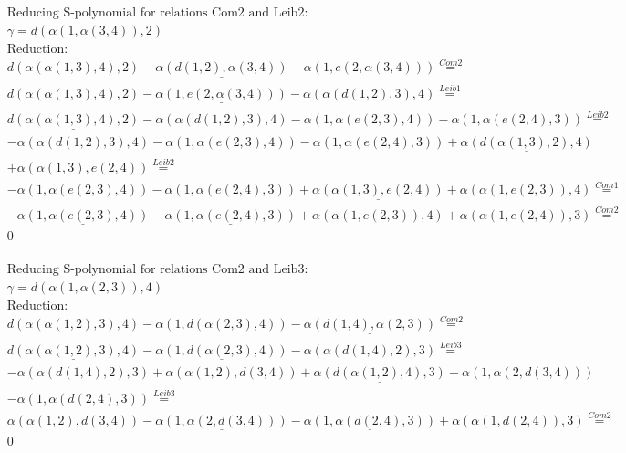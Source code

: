 \documentclass[11pt]{amsart}
\begin{document}
\begin{align*} 
& \text{Reducing S-polynomial for relations Com2 and Leib2:} \\ 
& \gamma = d(\alpha(1,\alpha(3,4)),2) \\ 
& \text{Reduction}: \\&d(\alpha(\alpha(1,3),4),2) - \underline{\alpha(d(1,2),\alpha(3,4))} - \alpha(1,e(2,\alpha(3,4))) \stackrel{ Com2 }{=}  \\ 
&d(\alpha(\alpha(1,3),4),2) - \underline{\alpha(1,e(2,\alpha(3,4)))} - \alpha(\alpha(d(1,2),3),4) \stackrel{ Leib1 }{=}  \\ 
&\underline{d(\alpha(\alpha(1,3),4),2)} - \alpha(\alpha(d(1,2),3),4) - \alpha(1,\alpha(e(2,3),4)) - \alpha(1,\alpha(e(2,4),3)) \stackrel{ Leib2 }{=}  \\ 
& - \alpha(\alpha(d(1,2),3),4) - \alpha(1,\alpha(e(2,3),4)) - \alpha(1,\alpha(e(2,4),3)) + \underline{\alpha(d(\alpha(1,3),2),4)}\\ 
 &  + \alpha(\alpha(1,3),e(2,4)) \stackrel{ Leib2 }{=}  \\ 
& - \alpha(1,\alpha(e(2,3),4)) - \alpha(1,\alpha(e(2,4),3)) + \underline{\alpha(\alpha(1,3),e(2,4))} + \alpha(\alpha(1,e(2,3)),4) \stackrel{ Com1 }{=}  \\ 
& - \underline{\alpha(1,\alpha(e(2,3),4))} - \underline{\alpha(1,\alpha(e(2,4),3))} + \alpha(\alpha(1,e(2,3)),4) + \alpha(\alpha(1,e(2,4)),3) \stackrel{ Com2 }{=}  \\ 
&0\\ 
\end{align*} 
 
\begin{align*} 
& \text{Reducing S-polynomial for relations Com2 and Leib3:} \\ 
& \gamma = d(\alpha(1,\alpha(2,3)),4) \\ 
& \text{Reduction}: \\&d(\alpha(\alpha(1,2),3),4) - \alpha(1,d(\alpha(2,3),4)) - \underline{\alpha(d(1,4),\alpha(2,3))} \stackrel{ Com2 }{=}  \\ 
&\underline{d(\alpha(\alpha(1,2),3),4)} - \underline{\alpha(1,d(\alpha(2,3),4))} - \alpha(\alpha(d(1,4),2),3) \stackrel{ Leib3 }{=}  \\ 
& - \alpha(\alpha(d(1,4),2),3) + \alpha(\alpha(1,2),d(3,4)) + \underline{\alpha(d(\alpha(1,2),4),3)} - \alpha(1,\alpha(2,d(3,4)))\\ 
 &  - \alpha(1,\alpha(d(2,4),3)) \stackrel{ Leib3 }{=}  \\ 
&\alpha(\alpha(1,2),d(3,4)) - \underline{\alpha(1,\alpha(2,d(3,4)))} - \underline{\alpha(1,\alpha(d(2,4),3))} + \alpha(\alpha(1,d(2,4)),3) \stackrel{ Com2 }{=}  \\ 
&0\\ 
\end{align*} 
 
\end{document}
